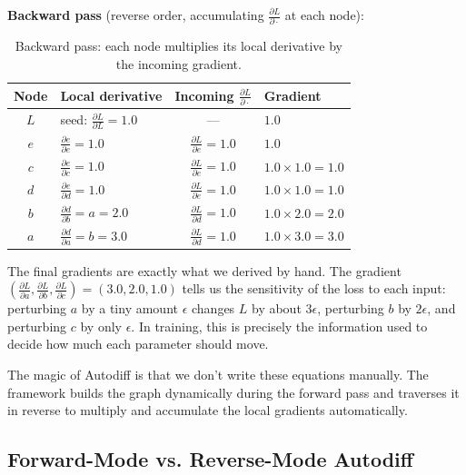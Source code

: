 \documentclass{tufte-handout}
\begin{document}
\textbf{Backward pass} (reverse order, accumulating $\frac{\partial L}{\partial \cdot}$ at each node):

\begin{table}[htbp]
\centering
\small
\begin{tabular}{@{}clcl@{}}
\toprule
\textbf{Node} & \textbf{Local derivative} & \textbf{Incoming} $\frac{\partial L}{\partial \cdot}$ & \textbf{Gradient} \\
\midrule
$L$ & seed: $\frac{\partial L}{\partial L} = 1.0$ & --- & $1.0$ \\
$e$ & $\frac{\partial e}{\partial e} = 1.0$ & $\frac{\partial L}{\partial e} = 1.0$ & $1.0$ \\
$c$ & $\frac{\partial e}{\partial c} = 1.0$ & $\frac{\partial L}{\partial e} = 1.0$ & $1.0 \times 1.0 = 1.0$ \\
$d$ & $\frac{\partial e}{\partial d} = 1.0$ & $\frac{\partial L}{\partial e} = 1.0$ & $1.0 \times 1.0 = 1.0$ \\
$b$ & $\frac{\partial d}{\partial b} = a = 2.0$ & $\frac{\partial L}{\partial d} = 1.0$ & $1.0 \times 2.0 = 2.0$ \\
$a$ & $\frac{\partial d}{\partial a} = b = 3.0$ & $\frac{\partial L}{\partial d} = 1.0$ & $1.0 \times 3.0 = 3.0$ \\
\bottomrule
\end{tabular}
\caption{Backward pass: each node multiplies its local derivative by the incoming gradient.}
\label{tab:backward_walk}
\end{table}

The final gradients are exactly what we derived by hand. The gradient $\left(\frac{\partial L}{\partial a}, \frac{\partial L}{\partial b}, \frac{\partial L}{\partial c}\right) = (3.0, 2.0, 1.0)$ tells us the sensitivity of the loss to each input: perturbing $a$ by a tiny amount $\epsilon$ changes $L$ by about $3\epsilon$, perturbing $b$ by $2\epsilon$, and perturbing $c$ by only $\epsilon$. In training, this is precisely the information used to decide how much each parameter should move.

The magic of Autodiff is that we don't write these equations manually. The framework builds the graph dynamically during the forward pass and traverses it in reverse to multiply and accumulate the local gradients automatically.

\subsection{Forward-Mode vs. Reverse-Mode Autodiff}
\end{document}
